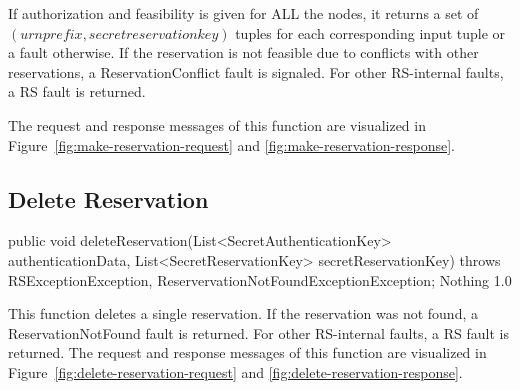 \documentclass[a4paper,11pt]{article}
\begin{document}
If authorization and feasibility is given for ALL the nodes, it returns a set of $(urnprefix, secretreservationkey)$ tuples for each corresponding input tuple or a fault otherwise. If the reservation is not feasible due to conflicts with other reservations, a ReservationConflict fault is signaled. For other RS-internal faults, a RS fault is returned.

The request and response messages of this function are visualized in Figure~\ref{fig:make-reservation-request} and \ref{fig:make-reservation-response}.
	

			\sectionfin
			\subsection{Delete Reservation}

\begin{apidoc}
	{public void deleteReservation(List<SecretAuthenticationKey> authenticationData, List<SecretReservationKey> secretReservationKey) throws RSExceptionException, ReservervationNotFoundExceptionException;} %
	{} %
	{
	} %
	{Nothing} %
	{} %
	{1.0} %
\end{apidoc}

This function deletes a single reservation. If the reservation was not found, a ReservationNotFound fault is returned.  For other RS-internal faults, a RS fault is returned. The request and response messages of this function are visualized in Figure~\ref{fig:delete-reservation-request} and \ref{fig:delete-reservation-response}.

		
			\sectionfin
\end{document}
